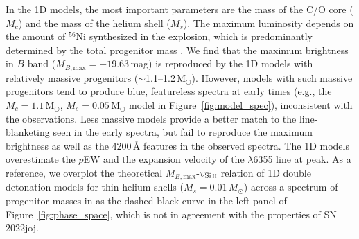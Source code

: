 \documentclass[twocolumn]{aastex631}
\newcommand{\sn}{SN\,2022joj}
\begin{document}
\begin{CJK*}{UTF8}{gbsn}
In the 1D models, the most important parameters are the mass of the C/O core ($M_c$) and the mass of the helium shell ($M_s$). The maximum luminosity depends on the amount of $^{56}$Ni synthesized in the explosion, which is predominantly determined by the total progenitor mass \citep[$M_c+M_s$;][]{polin_observational_2019}. We find that the maximum brightness in $B$ band ($M_{B,\mathrm{max}}=-19.63$\,mag) is reproduced by the 1D models with relatively massive progenitors ($\sim$1.1--1.2\,$\mathrm{M_\odot}$). However, models with such massive progenitors tend to produce blue, featureless spectra at early times (e.g., the $M_c=1.1\,\mathrm{M_\odot}$, $M_s=0.05\,\mathrm{M_\odot}$ model in Figure~\ref{fig:model_spec}), inconsistent with the observations. Less massive models provide a better match to the line-blanketing seen in the early spectra, but fail to reproduce the maximum brightness as well as the 4200\,\r{A} features in the observed spectra. The 1D models overestimate the $p$EW and the expansion velocity of the  $\lambda$6355 line at peak. As a reference, we overplot the theoretical $M_{B,\mathrm{max}}$-$v_\mathrm{Si\,\textsc{ii}}$ relation of 1D double detonation models for thin helium shells ($M_s = 0.01\,M_\odot$) across a spectrum of progenitor masses in \citet{polin_observational_2019} as the dashed black curve in the left panel of Figure~\ref{fig:phase_space}, which is not in agreement with the properties of \sn.


\end{CJK*}
\end{document}
